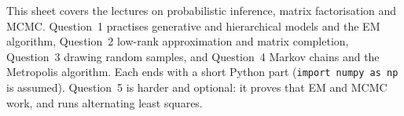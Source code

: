 \documentclass{sotonExamBoxes}    %
\begin{document}

\maketitle

This sheet covers the lectures on probabilistic inference, matrix
factorisation and MCMC.  Question~1 practises generative and
hierarchical models and the EM algorithm, Question~2 low-rank approximation and matrix
completion, Question~3 drawing random samples, and Question~4 Markov
chains and the Metropolis algorithm.  Each ends with a short Python
part (\texttt{import numpy as np} is assumed).  Question~5 is harder
and optional: it proves that EM and MCMC work, and runs alternating
least squares.

\end{document}
